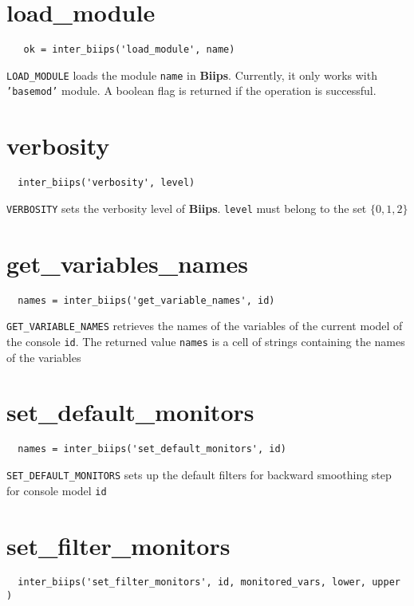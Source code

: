 \documentclass[11pt,twoside]{article}
\newcommand{\biips}{{\bf Biips}{}}
\begin{document}
\section{load\_module}

 \begin{lstlisting}
   ok = inter_biips('load_module', name)
 \end{lstlisting}

  \texttt{LOAD\_MODULE} loads the module \texttt{name} in \biips. Currently, it only works with \texttt{'basemod'} module. A
  boolean flag is returned if the operation is successful.

\section{verbosity}

 \begin{lstlisting}
  inter_biips('verbosity', level)
 \end{lstlisting}

  \texttt{VERBOSITY} sets the verbosity level of \biips . \texttt{level} must belong to the set $\{0,1,2\}$

\section{get\_variables\_names}

 \begin{lstlisting}
  names = inter_biips('get_variable_names', id)
 \end{lstlisting}

 \texttt{GET\_VARIABLE\_NAMES} retrieves the names of the variables of the current model of the console \texttt{id}. The returned value \texttt{names}
 is a cell of strings containing the names of the variables

\section{set\_default\_monitors}

 \begin{lstlisting}
  names = inter_biips('set_default_monitors', id)
 \end{lstlisting}

 \texttt{SET\_DEFAULT\_MONITORS} sets up the default filters for backward smoothing step for console model \texttt{id}

\section{set\_filter\_monitors}
 \begin{lstlisting}
  inter_biips('set_filter_monitors', id, monitored_vars, lower, upper )
 \end{lstlisting}
\end{document}
